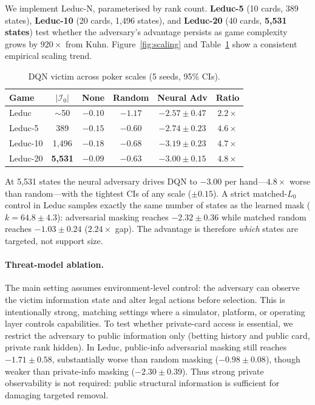 \documentclass{article}
\begin{document}
We implement Leduc-N, parameterised by rank count. \textbf{Leduc-5} (10 cards, 389 states), \textbf{Leduc-10} (20 cards, 1,496 states), and \textbf{Leduc-20} (40 cards, \textbf{5,531 states}) test whether the adversary's advantage persists as game complexity grows by $920\times$ from Kuhn. Figure~\ref{fig:scaling} and Table~\ref{tab:scaling} show a consistent empirical scaling trend.

\begin{table}[ht]
\centering
\caption{DQN victim across poker scales (5 seeds, 95\% CIs).}
\label{tab:scaling}
\begin{tabular}{lccccc}
\toprule
Game & $|\mathcal{I}_0|$ & None & Random & Neural Adv & Ratio \\
\midrule
Leduc & $\sim$50 & $-0.10$ & $-1.17$ & $-2.57 \pm 0.47$ & $2.2\times$ \\
Leduc-5 & 389 & $-0.15$ & $-0.60$ & $-2.74 \pm 0.23$ & $4.6\times$ \\
Leduc-10 & 1,496 & $-0.18$ & $-0.68$ & $-3.19 \pm 0.23$ & $4.7\times$ \\
Leduc-20 & \textbf{5,531} & $-0.09$ & $-0.63$ & $\mathbf{-3.00 \pm 0.15}$ & $\mathbf{4.8\times}$ \\
\bottomrule
\end{tabular}
\end{table}

At 5,531 states the neural adversary drives DQN to $-3.00$ per hand---$4.8\times$ worse than random---with the tightest CIs of any scale ($\pm 0.15$). A strict matched-$L_0$ control in Leduc samples exactly the same number of states as the learned mask ($k=64.8\pm4.3$): adversarial masking reaches $-2.32\pm0.36$ while matched random reaches $-1.03\pm0.24$ ($2.24\times$ gap). The advantage is therefore \emph{which} states are targeted, not support size.

\paragraph{Threat-model ablation.}
The main setting assumes environment-level control: the adversary can observe the victim information state and alter legal actions before selection. This is intentionally strong, matching settings where a simulator, platform, or operating layer controls capabilities. To test whether private-card access is essential, we restrict the adversary to public information only (betting history and public card, private rank hidden). In Leduc, public-info adversarial masking still reaches $-1.71 \pm 0.58$, substantially worse than random masking ($-0.98 \pm 0.08$), though weaker than private-info masking ($-2.30 \pm 0.39$). Thus strong private observability is not required: public structural information is sufficient for damaging targeted removal.
\end{document}
